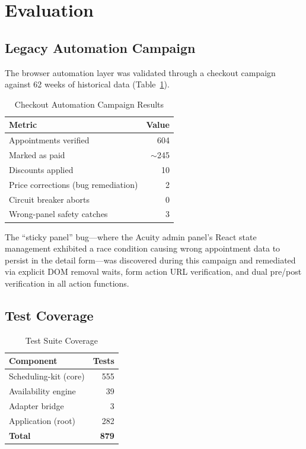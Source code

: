 \documentclass[conference]{IEEEtran}
\begin{document}
\section{Evaluation}

\subsection{Legacy Automation Campaign}

The browser automation layer was validated through a checkout campaign against 62 weeks of historical data (Table~\ref{tab:campaign}).

\begin{table}[htbp]
\caption{Checkout Automation Campaign Results}
\label{tab:campaign}
\centering
\begin{tabular}{@{}lr@{}}
\toprule
\textbf{Metric} & \textbf{Value} \\
\midrule
Appointments verified & 604 \\
Marked as paid & $\sim$245 \\
Discounts applied & 10 \\
Price corrections (bug remediation) & 2 \\
Circuit breaker aborts & 0 \\
Wrong-panel safety catches & 3 \\
\bottomrule
\end{tabular}
\end{table}

The ``sticky panel'' bug---where the Acuity admin panel's React state management exhibited a race condition causing wrong appointment data to persist in the detail form---was discovered during this campaign and remediated via explicit DOM removal waits, form action URL verification, and dual pre/post verification in all action functions.

\subsection{Test Coverage}

\begin{table}[htbp]
\caption{Test Suite Coverage}
\label{tab:tests}
\centering
\begin{tabular}{@{}lr@{}}
\toprule
\textbf{Component} & \textbf{Tests} \\
\midrule
Scheduling-kit (core) & 555 \\
Availability engine & 39 \\
Adapter bridge & 3 \\
Application (root) & 282 \\
\midrule
\textbf{Total} & \textbf{879} \\
\bottomrule
\end{tabular}
\end{table}
\end{document}
